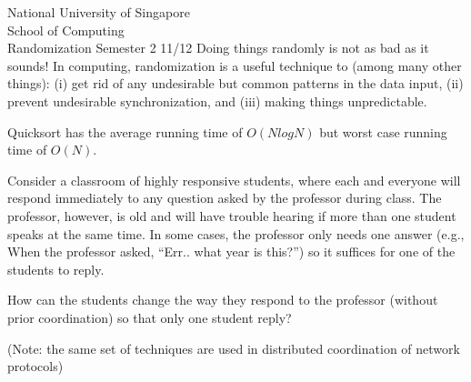 \documentclass[answers,a4paper,11pt]{exam}
\begin{document}
\extraheadheight{.5in}
%
{\large\sf National University of Singapore\\ School of Computing \\
\LARGE\sf Randomization}%
{\large\sf Semester 2 11/12}
\firstpageheadrule
\pagestyle{headandfoot}
Doing things randomly is not as bad as it sounds!  In computing, randomization is a useful technique to (among many other things): (i) get rid of any undesirable but common patterns in the data input, (ii) prevent undesirable synchronization, and (iii) making things unpredictable.

\begin{questions}
\question
Quicksort has the average running time of $O(N log N)$ but worst case running time of $O(N)$.  
\newpage
\question
Consider a classroom of highly responsive students, where each and everyone will respond immediately to any question asked by the professor during class.  The professor, however, is old and will have trouble hearing if more than one student speaks at the same time.  In some cases, the professor only needs one answer (e.g., When the professor asked, ``Err.. what year is this?'') so it suffices for one of the students to reply.

How can the students change the way they respond to the professor (without prior coordination) so that only one student reply?

(Note: the same set of techniques are used in distributed coordination of network protocols)
\fillwithdottedlines{3in}
\newpage
\question
{}
\end{questions}
\end{document}
